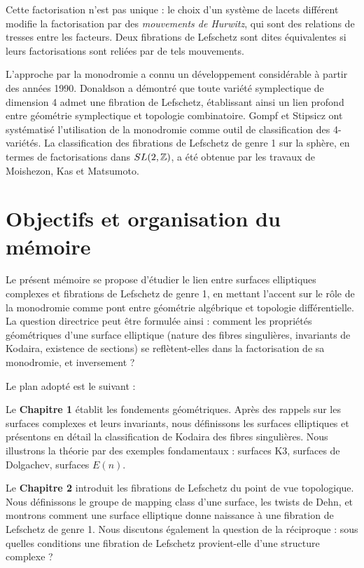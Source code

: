 Cette factorisation n'est pas unique : le choix d'un système de lacets différent modifie la factorisation par des \emph{mouvements de Hurwitz}, qui sont des relations de tresses entre les facteurs. Deux fibrations de Lefschetz sont dites équivalentes si leurs factorisations sont reliées par de tels mouvements.

L'approche par la monodromie a connu un développement considérable à partir des années 1990. Donaldson \cite{Donaldson99} a démontré que toute variété symplectique de dimension 4 admet une fibration de Lefschetz, établissant ainsi un lien profond entre géométrie symplectique et topologie combinatoire. Gompf et Stipsicz \cite{GS99} ont systématisé l'utilisation de la monodromie comme outil de classification des 4-variétés. La classification des fibrations de Lefschetz de genre 1 sur la sphère, en termes de factorisations dans $SL(2,\mathbb{Z})$, a été obtenue par les travaux de Moishezon, Kas et Matsumoto.

\section*{Objectifs et organisation du mémoire}

Le présent mémoire se propose d'étudier le lien entre surfaces elliptiques complexes et fibrations de Lefschetz de genre 1, en mettant l'accent sur le rôle de la monodromie comme pont entre géométrie algébrique et topologie différentielle. La question directrice peut être formulée ainsi : comment les propriétés géométriques d'une surface elliptique (nature des fibres singulières, invariants de Kodaira, existence de sections) se reflètent-elles dans la factorisation de sa monodromie, et inversement ?

Le plan adopté est le suivant :

Le \textbf{Chapitre 1} établit les fondements géométriques. Après des rappels sur les surfaces complexes et leurs invariants, nous définissons les surfaces elliptiques et présentons en détail la classification de Kodaira des fibres singulières. Nous illustrons la théorie par des exemples fondamentaux : surfaces K3, surfaces de Dolgachev, surfaces $E(n)$.

Le \textbf{Chapitre 2} introduit les fibrations de Lefschetz du point de vue topologique. Nous définissons le groupe de mapping class d'une surface, les twists de Dehn, et montrons comment une surface elliptique donne naissance à une fibration de Lefschetz de genre 1. Nous discutons également la question de la réciproque : sous quelles conditions une fibration de Lefschetz provient-elle d'une structure complexe ?


